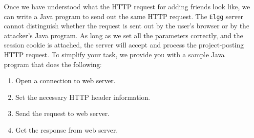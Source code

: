 Once we have understood what the HTTP request for adding friends look like, 
we can write a Java program to send out the 
same HTTP request. The {\tt Elgg} server cannot distinguish whether 
the request is sent out by the user's browser or by the attacker's
Java program. As long as we set all the parameters correctly,
and the session cookie is attached, the server will accept and process the 
project-posting HTTP request.
To simplify your task, we provide you with a sample Java program that does the 
following:

\begin{enumerate}
\item Open a connection to web server.
\item Set the necessary HTTP header information.
\item Send the request to web server.
\item Get the response from web server. 
\end{enumerate}


